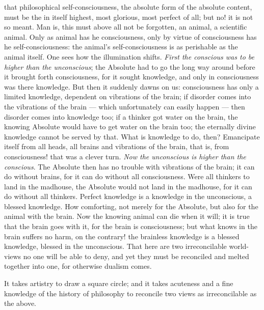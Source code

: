 \documentclass[12pt,a4paper,openany]{book}
\newcommand{\opage}[1]{\marginnote{\footnotesize\textit{[#1]}}}
\begin{document}
that philosophical self-consciousness, the
absolute form of the absolute content, must be the in itself
highest, most glorious, most perfect of all; but no! it
is not so meant. Man is, this must above all
not be forgotten, an animal, a scientific animal. Only as
animal has he consciousness, only by virtue of consciousness has
he self-consciousness: the animal's self-consciousness is as perishable
as the animal itself. One sees how the illumination
shifts. \emph{First the conscious was to be higher than
the unconscious}; the Absolute had to go the long
way around before it brought forth consciousness, for it sought
knowledge, and only in consciousness was there knowledge. But
then it suddenly dawns on us: consciousness has
only a limited knowledge, dependent on vibrations of the brain;
\setcounter{footnote}{0}%
\opage{9}if disorder comes into the vibrations of the brain --- which unfortunately
can easily happen --- then disorder comes into
knowledge too; if a thinker got water on the brain, the knowing
Absolute would have to get water on the brain too; the
eternally divine knowledge cannot be served by that. What
is knowledge to do, then? Emancipate itself from all heads,
all brains and vibrations of the brain, that is, from consciousness!
that was a clever turn. \emph{Now the unconscious is
higher than the conscious}. The Absolute then has no
trouble with vibrations of the brain; it can do without brains,
for it can do without all consciousness. Were all thinkers
to land in the madhouse, the Absolute would not land in the
madhouse, for it can do without all thinkers. Perfect
knowledge is a knowledge in the unconscious, a blessed
knowledge. How comforting, not merely for the Absolute, but
also for the animal with the brain. Now the knowing animal can
die when it will; it is true that the brain goes with it,
for the brain is consciousness; but what knows in the brain
suffers no harm, on the contrary! the brainless knowledge
is a blessed knowledge, blessed in the unconscious. That here are two
irreconcilable world-views no one will be able to deny, and
yet they must be reconciled and melted together into one, for
otherwise dualism comes.

It takes artistry to draw
a square circle; and it takes acuteness and
a fine knowledge of the history of philosophy to
reconcile two views as irreconcilable as the above.
\end{document}
